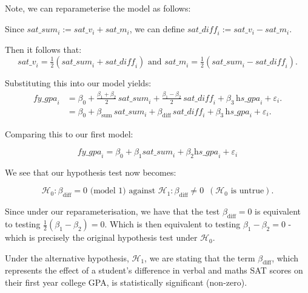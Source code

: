 \documentclass[]{article}
\begin{document}
\noindent Note, we can reparameterise the model as follows:\newline

\noindent Since $\displaystyle \textit{sat\_sum}_i:=\textit{sat\_v}_i+\textit{sat\_m}_i$, we can define $\displaystyle \textit{sat\_diff}_i :=\textit{sat\_v}_i-\textit{sat\_m}_i$.\newline

\noindent Then it follows that:
\[\displaystyle \textit{sat\_v}_i=\tfrac{1}{2}\left(\textit{sat\_sum}_i+\textit{sat\_diff}_i\right) \text{ and } \textit{sat\_m}_i=\tfrac{1}{2}\left(\textit{sat\_sum}_i-\textit{sat\_diff}_i\right).\]

\noindent Substituting this into our model yields:
\begin{align*}
\displaystyle
\textit{fy\_gpa}_i
&= \beta_0 +\tfrac{\beta_1+\beta_2}{2}\,\textit{sat\_sum}_i
+ \tfrac{\beta_1-\beta_2}{2}\,\textit{sat\_diff}_i
+ \beta_3\,\textit{hs\_gpa}_i + \varepsilon_i.\\
&= \beta_0 + \beta_{\text{sum}}\,\textit{sat\_sum}_i
+ \beta_{\text{diff}}\,\textit{sat\_diff}_i
+ \beta_3\,\textit{hs\_gpa}_i + \varepsilon_i.
\end{align*}

\noindent Comparing this to our first model:

\[
\textit{fy\_gpa}_i = \beta_0 + \beta_1 \textit{sat\_sum}_i + \beta_2  \textit{hs\_gpa}_i + \varepsilon_i
\]

\noindent We see that our hypothesis test now becomes:

\[
\mathcal{H}_0:\beta_{\text{diff}}=0 \text{ (model 1)    against     }\mathcal{H}_1: \beta_{\text{diff}} \neq 0 \,\,\,(\mathcal{H}_0\text{ is untrue}).
\]

\noindent Since under our reparameterisation, we have that the test $\beta_{\text{diff}}=0$ is equivalent to testing $\tfrac{1}{2}\left(\beta_1-\beta_2\right)=0$. Which is then equivalent to testing   $\beta_1-\beta_2=0$ - which is precisely the original hypothesis test under $\mathcal{H}_0$. \newline


\noindent Under the alternative hypothesis, $\mathcal{H}_1$, we are stating that the term $\beta_{\text{diff}}$, which represents the effect of a student's difference in verbal and maths SAT scores on their first year college GPA, is statistically significant (non-zero).\newline
\end{document}
